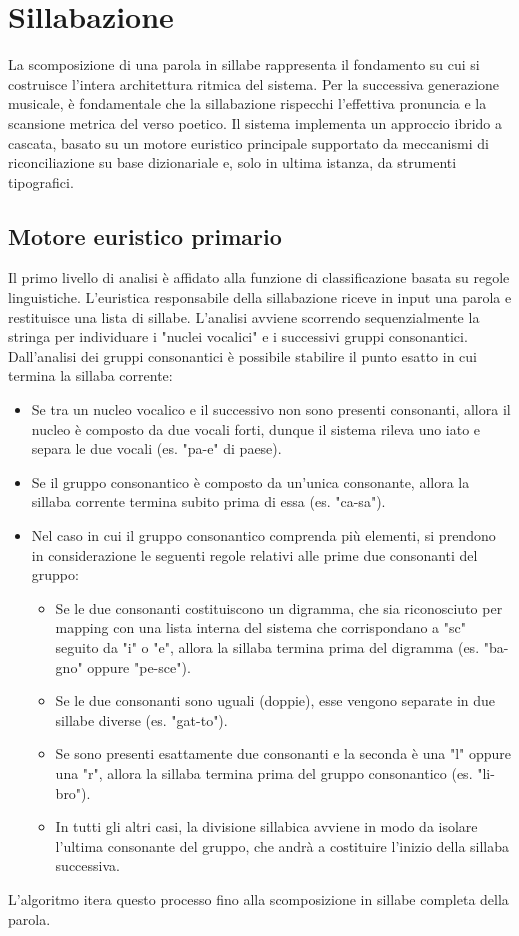\section{Sillabazione}
La scomposizione di una parola in sillabe rappresenta il fondamento su cui si costruisce l'intera architettura ritmica del sistema. 
Per la successiva generazione musicale, è fondamentale che la sillabazione rispecchi l'effettiva pronuncia e la scansione metrica del verso poetico. 
Il sistema implementa un approccio ibrido a cascata, basato su un motore euristico principale supportato da meccanismi di riconciliazione su base 
dizionariale e, solo in ultima istanza, da strumenti tipografici.

\subsection{Motore euristico primario}
Il primo livello di analisi è affidato alla funzione di classificazione basata su regole linguistiche. L'euristica responsabile della sillabazione riceve 
in input una parola e restituisce una lista di sillabe. L'analisi avviene scorrendo sequenzialmente la stringa per individuare i "nuclei vocalici" 
e  i successivi gruppi consonantici. Dall'analisi dei gruppi consonantici è possibile stabilire il punto esatto in cui termina la sillaba corrente:
\begin{itemize}
    \item Se tra un nucleo vocalico e il successivo non sono presenti consonanti, allora il nucleo è composto da due vocali forti, 
          dunque il sistema rileva uno iato e separa le due vocali (es. "pa-e" di paese).
    \item Se il gruppo consonantico è composto da un'unica consonante, allora la sillaba corrente termina subito prima di essa (es. "ca-sa").
    \item Nel caso in cui il gruppo consonantico comprenda più elementi, si prendono in considerazione le seguenti regole relativi alle 
          prime due consonanti del gruppo:
	\begin{itemize} 
        \item Se le due consonanti costituiscono un digramma, che sia riconosciuto per mapping con una lista interna del sistema che corrispondano 
              a "sc" seguito da "i" o "e", allora la sillaba termina prima del digramma (es. "ba-gno" oppure "pe-sce").
	    \item Se le due consonanti sono uguali (doppie), esse vengono separate in due sillabe diverse (es. "gat-to").
	    \item Se sono presenti esattamente due consonanti e la seconda è una "l" oppure una "r", allora la sillaba termina prima del gruppo 
              consonantico (es. "li-bro").
	    \item In tutti gli altri casi, la divisione sillabica avviene in modo da isolare l'ultima consonante del gruppo, che andrà a costituire 
              l'inizio della sillaba successiva.
    \end{itemize}
\end{itemize}
L'algoritmo itera questo processo fino alla scomposizione in sillabe completa della parola.

